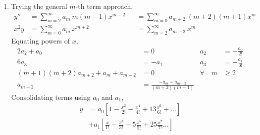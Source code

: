 \begin{enumerate}
    \item Trying the general $ m $-th term approach,
          \begin{align}
              y''    & = \sum_{m=2}^{\infty}a_m\ m(m-1)x^{m-2}     &
                     & = \sum_{m=0}^{\infty}a_{m+2}\ (m+2)(m+1)x^m   \\
              x^{2}y & = \sum_{m=0}^{\infty}a_m\ x^{m+2}           &
                     & = \sum_{m = 2}^{\infty}a_{m-2}\ x^m
          \end{align}
          Equating powers of $ x $,
          \begin{align}
              2a_2 + a_0                        & = 0               &
              a_2                               & = -\frac{a_0}{2!}   \\
              6a_3                              & = -a_1            &
              a_3                               & = -\frac{a_1}{3!}   \\
              (m+1)(m+2)a_{m+2} + a_m + a_{m-2} & = 0               &
              \forall \quad m                   & \geq 2              \\
              a_{m+2}                           & = \frac{-a_{m} -
              a_{m-2}}{(m+2)(m+1)}
          \end{align}
          Consolidating terms using $ a_0 $ and $a_1$,
          \begin{align}
              y & = a_0 \left[ 1 - \frac{x^2}{2!} - \frac{x^4}{4!}
              + 13\frac{x^6}{6!} + \dots \right]                               \\
                & + a_1 \left[ \frac{x}{1!} - \frac{x^3}{3!} - 5\frac{x^5}{5!}
                  + 25\frac{x^7}{7!} \dots \right]
          \end{align}


\end{enumerate}
